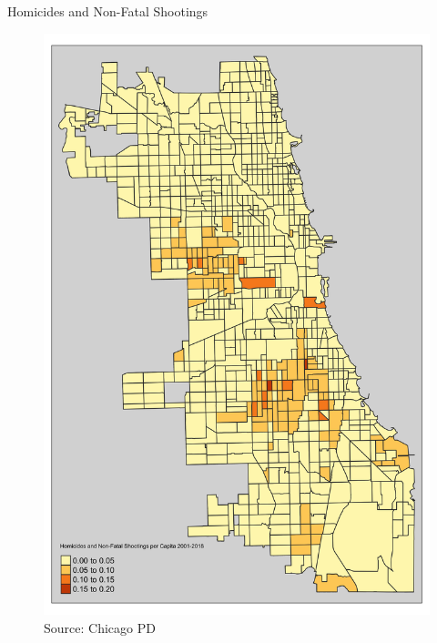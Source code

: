 \documentclass[10pt,ignorenonframetext,]{beamer}
\begin{document}
\begin{frame}{Homicides and Non-Fatal Shootings}
\protect\hypertarget{homicides-and-non-fatal-shootings-1}{}

\begin{figure}
\centering
\includegraphics{../chicago/figs/chi_tsa_map.png}
\caption{Source: Chicago PD}
\end{figure}

\end{frame}
\end{document}
